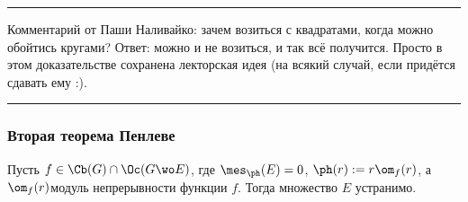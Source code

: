 \documentclass[a4paper]{article}
\newenvironment{petit}
{\par \smallskip \hrule \smallskip \footnotesize}
{\par \smallskip \hrule \smallskip}
\begin{document}
\begin{petit}
Комментарий от Паши Наливайко: зачем возиться с квадратами, когда можно обойтись кругами?  Ответ: можно и не возиться,
и так всё получится. Просто в этом доказательстве сохранена лекторская идея (на всякий случай, если придётся сдавать ему :).
\end{petit}

\subsubsection{Вторая теорема Пенлеве}

\begin{theorem}[Е.\,П.\,Долженко]
Пусть $f\in \Cb(G) \cap \Oc(G\wo E)$, где $\mes_\ph(E)=0$, $\ph(r) := r\om_f(r)$, а $\om_f(r)$\т модуль непрерывности
функции $f$. Тогда множество $E$ устранимо.
\end{theorem}
\end{document}
